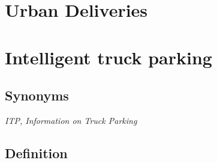 \documentclass[
]{book}
\begin{document}
\hypertarget{urban_delivery}{%
\section{Urban Deliveries}\label{urban_delivery}}

\hypertarget{intelligent_truck_park}{%
\section{Intelligent truck parking}\label{intelligent_truck_park}}

\hypertarget{synonyms-20}{%
\subsection*{Synonyms}\label{synonyms-20}}

\emph{ITP, Information on Truck Parking}

\hypertarget{definition-23}{%
\subsection*{Definition}\label{definition-23}}
\end{document}

